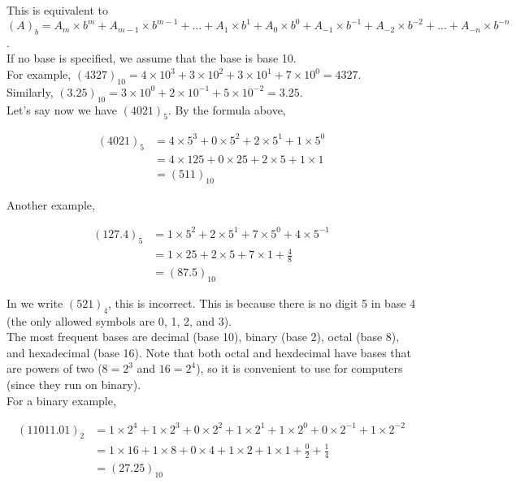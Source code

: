 \documentclass[]{article}
\begin{document}
This is equivalent to $(A)_b = A_m\times b^m + A_{m-1}\times b^{m-1} + ... + A_1\times b^1 + A_0\times b^0 + A_{-1}\times b^{-1} + A_{-2}\times b^{-2} + ... + A_{-n}\times b^{-n}$.\\

If no base is specified, we assume that the base is base 10.\\

For example, $(4327)_{10} = 4 \times 10^3 + 3 \times 10^2 + 3 \times 10^1 + 7 \times 10^0 = 4327$.\\
Similarly, $(3.25)_{10} = 3 \times 10^0 + 2 \times 10^{-1} + 5 \times 10^{-2} = 3.25$.\\

Let's say now we have $(4021)_5$. By the formula above, 

\begin{align*}
	(4021)_5 &= 4 \times 5^3 + 0 \times 5^2 + 2 \times 5^1 + 1 \times 5^0\\
	&=  4 \times 125 + 0 \times 25 + 2 \times 5 + 1 \times 1\\
	&= (511)_{10}
\end{align*}\bigbreak


Another example, 

\begin{align*}
	(127.4)_5 &= 1 \times 5^2 + 2 \times 5^1 + 7 \times 5^0 + 4 \times 5^{-1}\\
	&=  1 \times 25 + 2 \times 5 + 7 \times 1 + \frac{4}{8}\\
	&= (87.5)_{10}
\end{align*}\bigbreak


In we write $(521)_4$, this is incorrect. This is because there is no digit 5 in base 4 (the only allowed symbols are 0, 1, 2, and 3).\\

The most frequent bases are decimal (base 10), binary (base 2), octal (base 8), and hexadecimal (base 16). Note that both octal and hexdecimal have bases that are powers of two ($8=2^3$ and $16=2^4$), so it is convenient to use for computers (since they run on binary).\\

For a binary example, 

\begin{align*}
	(11011.01)_2 &= 1 \times 2^4 + 1 \times 2^3 + 0 \times 2^2 + 1 \times 2^1 + 1 \times 2^0 + 0 \times 2^{-1} + 1 \times 2^{-2} \\
	&=  1 \times 16 + 1 \times 8 + 0 \times 4 + 1 \times 2 + 1 \times 1 + \frac{0}{2} + \frac{1}{4} \\
	&= (27.25)_{10}
\end{align*}\bigbreak
\end{document}
